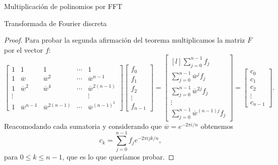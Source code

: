 \begin{chapter}{Multiplicación de polinomios por FFT}
\begin{section}{Transformada de Fourier discreta}
\begin{proof}
            Para probar la segunda afirmación del teorema multiplicamos la matriz $\overline{F}$ por el vector $f$:
            \begin{equation*}
                \begin{bmatrix}
                    1 & 1 & 1 & \cdots & 1 \\
                    1 & \overline{w} & \overline{w}^2 & \cdots & \overline{w}^{n-1} \\
                    1 & \overline{w}^2 & \overline{w}^4 & \cdots & \overline{w}^{2(n-1)} 
                    \\ \vdots & &  &  &\vdots \\
                    1 & \overline{w}^{n-1} &\overline{w}^{2(n-1)} & \cdots & \overline{w}^{(n-1)^2} 
                \end{bmatrix}
                \begin{bmatrix}
                    f_0\\ f_1 \\ f_2 \\ \vdots\\  f_{n-1}
                \end{bmatrix}
                =
                \begin{bmatrix*}[l]
                    \sum_{j=0}^{n-1} f_j\\ \sum_{j=0}^{n-1} \overline w^jf_j\\ \sum_{j=0}^{n-1}  \overline w^{2j}f_j \\ \vdots\\  \sum_{j=0}^{n-1} \overline w^{(n-1)j}f_j
                \end{bmatrix*} =
                \begin{bmatrix}
                    c_0\\ c_1 \\ c_2 \\ \vdots\\  c_{n-1}
                \end{bmatrix}.
            \end{equation*}
            Reacomodando cada sumatoria y considerando que $ \overline w = e^{-2 \pi i/n}$ obtenemos
            \begin{equation*}
                c_k = \sum_{j=0}^{n-1} f_j e^{-2\pi i j {k}/{n}},
            \end{equation*}
            para $0 \le k \le n-1$, que es lo que queríamos probar.
        \end{proof}


\end{section}
\end{chapter}
